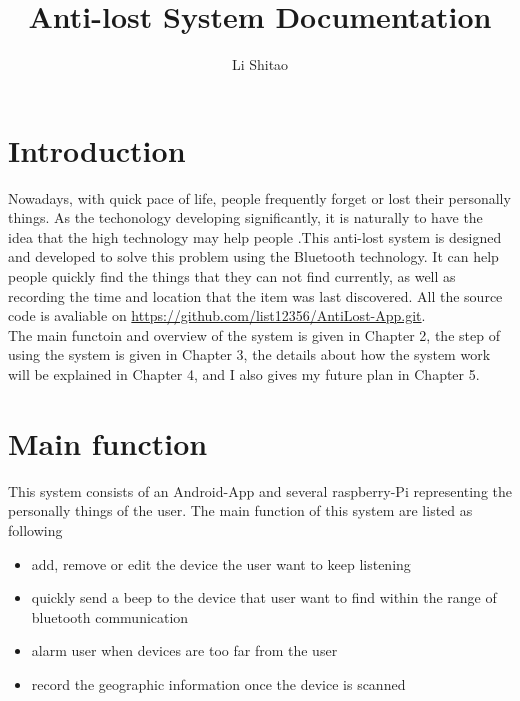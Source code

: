 \documentclass{article}
\begin{document}
\title{Anti-lost System Documentation}
\author{Li Shitao}
\maketitle
\section{Introduction}

Nowadays, with quick pace of life, people frequently forget or lost their personally things. As the techonology developing significantly, it is naturally to have the idea that the high technology may help people .This anti-lost system is designed and developed to solve this problem using the Bluetooth technology. It can help people quickly find the things that they can not find currently, as well as recording the time and location that the item was last discovered. All the source code is avaliable on  \url{https://github.com/list12356/AntiLost-App.git}.\\
The main functoin and overview of the system is given in Chapter 2, the step of using the system is given in Chapter 3, the details about how the system work will be explained in Chapter 4, and I also gives my future plan in Chapter 5.
\section{Main function}
This system consists of an Android-App and several raspberry-Pi representing the personally things of the user. The main function of this system are listed as following
\begin{itemize}
\item add, remove or edit the device the user want to keep listening
\item quickly send a beep to the device that user want to find within the range of bluetooth communication
\item alarm user when devices are too far from the user
\item record the geographic information once the device is scanned
\end{itemize}
\end{document}
